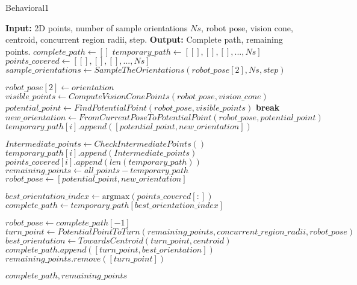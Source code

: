 \begin{algorithm}[H]
    \caption{Behavioral1}
    \begin{algorithmic}[1]
        \Statex \textbf{Input:} 2D points, number of sample orientations $Ns$, robot pose, vision cone, centroid, concurrent region radii, step.
        \Statex \textbf{Output:} Complete path, remaining points.
        \newline
        \State $complete\_path \gets []$
        \State $temporary\_path \gets [[], [], [], ..., Ns]$
        \State $points\_covered \gets [[], [], [], ..., Ns]$
        \State $sample\_orientations \gets SampleTheOrientations(robot\_pose[2], Ns, step)$
        
            \State $robot\_pose[2] \gets orientation$
                \State $visible\_points \gets ComputeVisionConePoints(robot\_pose, vision\_cone)$
                \State $potential\_point \gets FindPotentialPoint(robot\_pose, visible\_points)$
                \State \textbf{break}
                \EndIf
                \State $new\_orientation \gets FromCurrentPoseToPotentialPoint(robot\_pose, potential\_point)$
                \State $temporary\_path[i].append([potential\_point, new\_orientation])$

                \State $Intermediate\_points \gets CheckIntermediatePoints()$
                \State $temporary\_path[i].append(Intermediate\_points)$
                \State $points\_covered[i].append(len(temporary\_path))$
                \State $remaining\_points \gets all\_points - temporary\_path$
                \State $robot\_pose \gets [potential\_point, new\_orientation]$
            \EndWhile
        \EndFor
        
        \State $best\_orientation\_index \gets \text{argmax}(points\_covered[:])$
        \State $complete\_path \gets temporary\_path[best\_orientation\_index]$
        
        \State $robot\_pose \gets complete\_path[-1]$
        \State $turn\_point \gets PotentialPointToTurn(remaining\_points, concurrent\_region\_radii, robot\_pose)$
        \State $best\_orientation \gets TowardsCentroid(turn\_point, centroid)$
        \State $complete\_path.append([turn\_point, best\_orientation])$
        \State $remaining\_points.remove([turn\_point])$

        \State \Return $complete\_path, remaining\_points$
    \end{algorithmic}
\end{algorithm}

